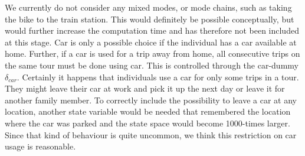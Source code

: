 %

We currently do not consider any mixed modes, or mode chains, such as taking the bike to the train station. This would definitely be possible conceptually, but would further increase the computation time and has therefore not been included at this stage. Car is only a possible choice if the individual has a car available at home. Further, if a car is used for a trip away from home, all consecutive trips on the same tour must be done using car. This is controlled through the car-dummy $\delta_{car}$. Certainly it happens that individuals use a car for only some trips in a tour. They might leave their car at work and pick it up the next day or leave it for another family member. To correctly include the possibility to leave a car at any location, another state variable would be needed that remembered the location where the car was parked and the state space would become 1000-times larger. Since that kind of behaviour is quite uncommon, we think this restriction on car usage is reasonable. %

